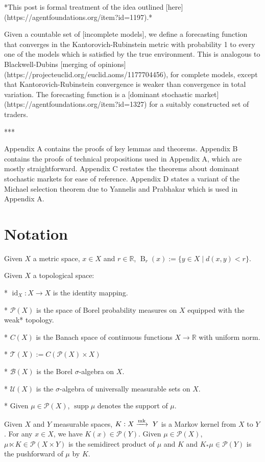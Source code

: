 \documentclass[a4paper]{article}
\DeclareMathOperator{\Supp}{supp}
\newcommand{\Reals}{\mathbb{R}}
\newcommand{\Markov}{\xrightarrow{\textnormal{mk}}}
\newcommand{\Prob}{\mathcal{P}}
\newcommand{\T}{\mathcal{T}}
\newcommand{\UM}{\mathcal{U}}
\newcommand{\I}{\operatorname{id}}
\newcommand{\Ball}{\operatorname{B}}
\begin{document}
*This post is formal treatment of the idea outlined [here](https://agentfoundations.org/item?id=1197).*

Given a countable set of [incomplete models], we define a forecasting function that converges in the Kantorovich-Rubinstein metric with probability 1 to every one of the models which is satisfied by the true environment. This is analogous to Blackwell-Dubins [merging of opinions](https://projecteuclid.org/euclid.aoms/1177704456), for complete models, except that Kantorovich-Rubinstein convergence is weaker than convergence in total variation. The forecasting function is a [dominant stochastic market](https://agentfoundations.org/item?id=1327) for a suitably constructed set of traders.

***

Appendix A contains the proofs of key lemmas and theorems. Appendix B contains the proofs of technical propositions used in Appendix A, which are mostly straightforward. Appendix C restates the theorems about dominant stochastic markets for ease of reference. Appendix D states a variant of the Michael selection theorem due to Yannelis and Prabhakar which is used in Appendix A.

\section{Notation}

Given ${X}$ a metric space, ${x \in X}$ and $r \in \Reals$, ${\Ball_r(x):=\{y \in X \mid d(x,y) < r\}}$.

Given ${X}$ a topological space:

* ${\I_X: X \rightarrow X}$ is the identity mapping.

* ${\Prob(X)}$ is the space of Borel probability measures on ${X}$ equipped with the weak* topology.

* ${C(X)}$ is the Banach space of continuous functions ${X \rightarrow \Reals}$ with uniform norm.

* $\T(X):= C(\Prob(X) \times X)$

* ${\mathcal{B}}(X)$ is the Borel ${\sigma}$-algebra on ${X}$.

* ${\UM(X)}$ is the ${\sigma}$-algebra of universally measurable sets on ${X}$.

* Given ${\mu \in \Prob(X)}$, ${\Supp \mu}$ denotes the support of ${\mu}$. 

Given ${X}$ and ${Y}$ measurable spaces, ${K: X \Markov\ Y}$ is a Markov kernel from ${X}$ to ${Y}$. For any ${x \in X}$, we have ${K(x) \in \Prob(Y)}$. Given ${\mu \in \Prob(X)}$, ${\mu \ltimes K \in \Prob(X \times Y)}$ is the semidirect product of ${\mu}$ and ${K}$ and ${K_*\mu \in \Prob(Y)}$ is the pushforward of ${\mu}$ by ${K}$.
\end{document}
